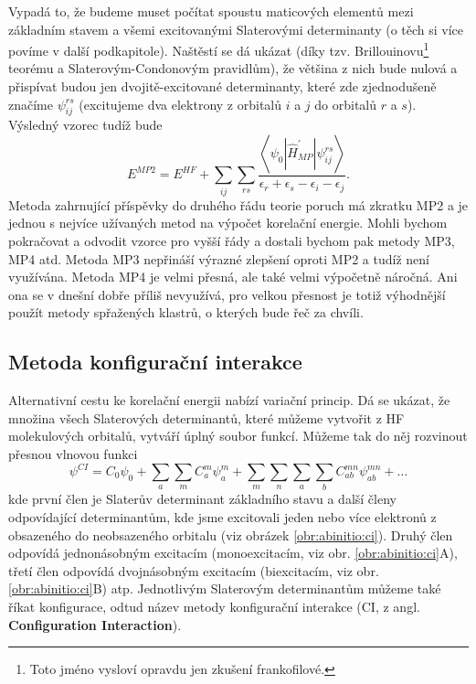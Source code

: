 Vypadá to, že budeme muset počítat spoustu maticových elementů mezi základním stavem a všemi excitovanými Slaterovými determinanty (o těch si více povíme v další podkapitole). Naštěstí se dá ukázat (díky tzv. Brillouinovu\footnote{Toto jméno vysloví opravdu jen zkušení frankofilové.} teorému a Slaterovým-Condonovým pravidlům), že většina z nich bude nulová a přispívat budou jen dvojitě-excitované determinanty, které zde zjednodušeně značíme $\psi_{ij}^{rs}$ (excitujeme dva elektrony z orbitalů $i$ a $j$ do orbitalů $r$ a $s$). Výsledný vzorec tudíž bude
\begin{equation}
E^{MP2}= E^{HF} + \sum_{ij} \sum_{rs} \frac{\left < \psi_0 | \hat{H}^{\prime}_{MP} | \psi_{ij}^{rs} \right > }{\epsilon_r+\epsilon_s-\epsilon_i-\epsilon_j} .
\end{equation}
Metoda zahrnující příspěvky do druhého řádu teorie poruch má zkratku MP2 a je jednou s nejvíce užívaných metod na výpočet korelační energie. Mohli bychom pokračovat a odvodit vzorce pro vyšší řády a dostali bychom pak metody MP3, MP4 atd. 
Metoda MP3 nepřináší výrazné zlepšení oproti MP2 a tudíž není využívána. Metoda MP4 je velmi přesná, ale také velmi výpočetně náročná. Ani ona se v dnešní dobře příliš nevyužívá, pro velkou přesnost je totiž výhodnější použít metody spřažených klastrů, o kterých bude řeč za chvíli.


\subsection{Metoda konfigurační interakce}

Alternativní cestu ke korelační energii nabízí variační princip. Dá se ukázat, že množina všech Slaterových determinantů, které můžeme vytvořit z HF molekulových orbitalů, vytváří úplný soubor funkcí. Můžeme tak do něj rozvinout přesnou vlnovou funkci 
\begin{equation}
\psi^{CI}=C_0\psi_0+\sum_a\sum_m C_a^m\psi_a^m+\sum_m \sum_n \sum_a \sum_b C_{ab}^{mn}\psi_{ab}^{mn}+\dots
\label{rov:CIrozvoj}
\end{equation}
kde první člen je Slaterův determinant základního stavu a další členy odpovídající determinantům, kde jsme excitovali jeden nebo více elektronů z obsazeného do neobsazeného orbitalu (viz obrázek \ref{obr:abinitio:ci}). Druhý člen odpovídá jednonásobným excitacím (monoexcitacím, viz obr. \ref{obr:abinitio:ci}A), třetí člen odpovídá dvojnásobným excitacím (biexcitacím,
viz obr.\,\ref{obr:abinitio:ci}B) atp. Jednotlivým Slaterovým determinantům můžeme také říkat konfigurace, odtud název metody konfigurační interakce (CI, z angl. \textbf{Configuration Interaction}).

